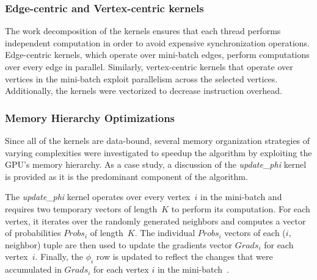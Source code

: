 
\subsubsection{Edge-centric and Vertex-centric kernels}
The work decomposition of the kernels ensures that each thread performs
independent computation in order to avoid expensive synchronization operations.
Edge-centric kernels, which operate over mini-batch edges, perform computations
over every edge in parallel.  Similarly, vertex-centric kernels that operate
over vertices in the mini-batch exploit parallelism across the selected
vertices.
Additionally, the kernels were vectorized to decrease instruction overhead.

\subsubsection{Memory Hierarchy Optimizations}
\label{gpu-design}

Since all of the kernels are data-bound, several memory organization strategies
of varying complexities were investigated to speedup the algorithm by
exploiting the GPU's memory hierarchy.
As a case study, a discussion of the \textit{update\_phi} kernel is provided as it is
the predominant component of the algorithm.

The \textit{update\_phi} kernel operates over every vertex~$i$ in the mini-batch and
requires two temporary vectors of length~$K$ to perform its computation. For
each vertex, it iterates over the randomly generated neighbors and computes a
vector of probabilities $Probs_i$ of length~$K$. The individual $Probs_i$ vectors
of each ($i$, neighbor) tuple are then used to update the gradients vector
$Grads_i$ for each vertex~$i$. Finally, the $\phi_i$ row is updated to
reflect the changes that were accumulated in $Grads_i$ for each vertex $i$ in the
mini-batch~\Minibatch.

